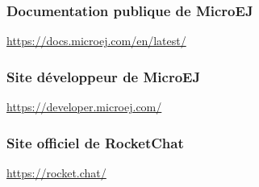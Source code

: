 \documentclass[french,a4paper,12pt]{report}
\begin{document}
\subsubsection{Documentation publique de MicroEJ}

\href{https://docs.microej.com/en/latest/}{https://docs.microej.com/en/latest/}

\subsubsection{Site développeur de MicroEJ}

\href{https://developer.microej.com/}{https://developer.microej.com/} 

\subsubsection{Site officiel de RocketChat}

\href{https://rocket.chat/}{https://rocket.chat/}
\end{document}
